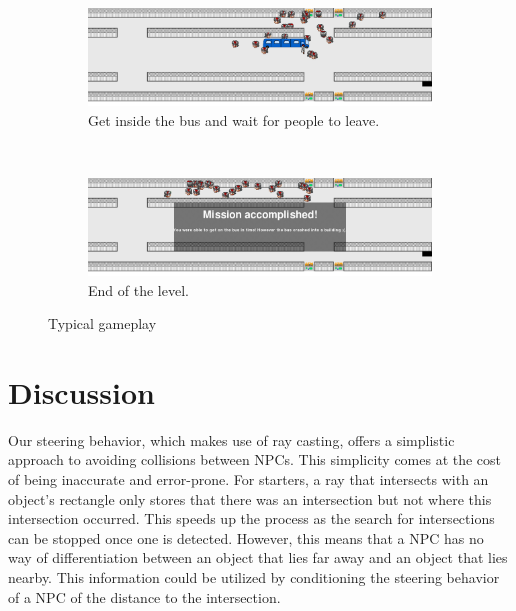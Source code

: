 \documentclass[a4paper,pdf,12pt]{article}
\begin{document}
\begin{figure}
        \begin{subfigure}[b]{0.4\textwidth}
                \centering
                \includegraphics[width=\textwidth]{../screenshots/screenshot_31108.png}
                \caption{Get inside the bus and wait for people to leave.}
                \label{fig:screenshot05}
        \end{subfigure}
        ~ %
        \begin{subfigure}[b]{0.4\textwidth}
                \centering
                \includegraphics[width=\textwidth]{../screenshots/screenshot_62502.png}
                \caption{End of the level.}
                \label{fig:screenshot06}
        \end{subfigure}

        \caption{Typical gameplay}\label{fig:gameplay}
\end{figure}

\section{Discussion}
\label{sec:Discussion}
Our steering behavior, which makes use of ray casting, offers a simplistic approach to avoiding collisions between NPCs. This simplicity comes at the cost of being inaccurate and error-prone. For starters, a ray that intersects with an object's rectangle only stores that there was an intersection but not where this intersection occurred. This speeds up the process as the search for intersections can be stopped once one is detected. However, this means that a NPC has no way of differentiation between an object that lies far away and an object that lies nearby. This information could be utilized by conditioning the steering behavior of a NPC of the distance to the intersection. 
\end{document}

